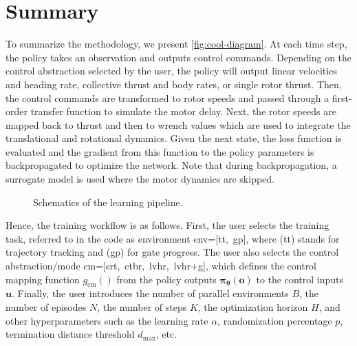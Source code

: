\newpage
\section{Summary}\label{sec:summary}

To summarize the methodology, we present \autoref{fig:cool-diagram}. 
At each time step, the policy takes an observation and outputs control commands.
Depending on the control abstraction selected by the user, the policy will output linear velocities and heading rate, collective thrust and body rates, or single rotor thrust.
Then, the control commands are transformed to rotor speeds and passed through a first-order transfer function to simulate the motor delay.
Next, the rotor speeds are mapped back to thrust and then to wrench values which are used to integrate the translational and rotational dynamics.
Given the next state, the loss function is evaluated and the gradient from this function to the policy parameters is backpropagated to optimize the network.
Note that during backpropagation, a surrogate model is used where the motor dynamics are skipped.



\begin{figure}[H]
    \centering
    \resizebox{0.9\textwidth}{!}{}
    \caption{Schematics of the learning pipeline.}
    \label{fig:cool-diagram}
\end{figure}


Hence, the training workflow is as follows. 
First, the user selects the training task, referred to in the code as environment env=[tt,\ gp], where (tt) stands for trajectory tracking and (gp) for gate progress.
The user also selects the control abstraction/mode cm=[srt,\ ctbr,\ lvhr,\ lvhr+g], which defines the control mapping function $g_{\text{cm}}()$ from the policy outputs $\boldsymbol{\pi_\theta}(\mathbf{o})$ to the control inputs $\mathbf{u}$. 
Finally, the user introduces the number of parallel environments $B$, the number of episodes $N$, the number of steps $K$, the optimization horizon $H$, and other hyperparameters such as the learning rate $\alpha$, randomization percentage $p$, termination distance threshold $d_\text{max}$, etc. 

